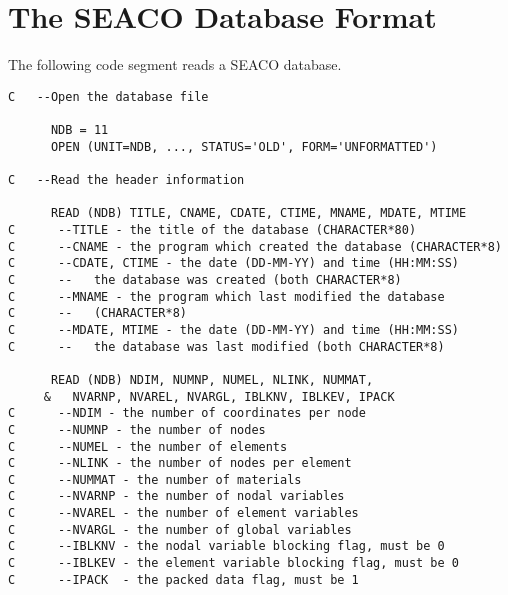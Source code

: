 \chapter{The SEACO Database Format} \label{appx:seaco}

The following code segment reads a SEACO database. 

\begin{verbatim}
C   --Open the database file

      NDB = 11
      OPEN (UNIT=NDB, ..., STATUS='OLD', FORM='UNFORMATTED')

C   --Read the header information

      READ (NDB) TITLE, CNAME, CDATE, CTIME, MNAME, MDATE, MTIME
C      --TITLE - the title of the database (CHARACTER*80)
C      --CNAME - the program which created the database (CHARACTER*8)
C      --CDATE, CTIME - the date (DD-MM-YY) and time (HH:MM:SS)
C      --   the database was created (both CHARACTER*8)
C      --MNAME - the program which last modified the database
C      --   (CHARACTER*8)
C      --MDATE, MTIME - the date (DD-MM-YY) and time (HH:MM:SS)
C      --   the database was last modified (both CHARACTER*8)

      READ (NDB) NDIM, NUMNP, NUMEL, NLINK, NUMMAT,
     &   NVARNP, NVAREL, NVARGL, IBLKNV, IBLKEV, IPACK
C      --NDIM - the number of coordinates per node
C      --NUMNP - the number of nodes
C      --NUMEL - the number of elements
C      --NLINK - the number of nodes per element
C      --NUMMAT - the number of materials
C      --NVARNP - the number of nodal variables
C      --NVAREL - the number of element variables
C      --NVARGL - the number of global variables
C      --IBLKNV - the nodal variable blocking flag, must be 0
C      --IBLKEV - the element variable blocking flag, must be 0
C      --IPACK  - the packed data flag, must be 1
\end{verbatim}
\newpage
